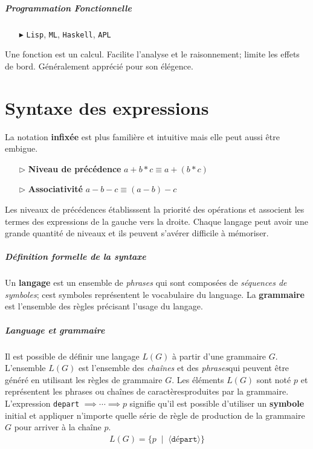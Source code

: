 \documentclass{report}
\begin{document}
\begin{multicols*}{3}
    \paragraph{Programmation Fonctionnelle}
    \begin{itemize}
        \item [$\blacktriangleright$ ] \texttt{Lisp}, \texttt{ML}, \texttt{Haskell}, \texttt{APL}
    \end{itemize}
    Une fonction est un calcul. Facilite l'analyse et le raisonnement; limite
    les effets de bord. Généralement apprécié pour son élégence. 


    \chapter{Syntaxe des expressions}
    La notation \textbf{infixée} est plus familière et intuitive mais elle peut aussi être embigue.   
    \begin{itemize}
        \item [$\rhd$ ] \textbf{Niveau de précédence} $a + b * c \equiv a + (b * c)$  
        \item [$\rhd$ ] \textbf{Associativité} $a - b - c \equiv (a - b) - c$
    \end{itemize}
    Les niveaux de précédences établisssent la priorité des opérations et
    associent les termes des expressions de la gauche vers la droite. Chaque
    langage peut avoir une grande quantité de niveaux et ils peuvent s'avérer
    difficile à mémoriser. 

    \paragraph{Définition formelle de la syntaxe}
    Un \textbf{langage} est un ensemble de \textit{phrases} qui sont composées
    de \textit{séquences de symboles}; cest symboles représentent le vocabulaire
    du language. La \textbf{grammaire} est l'ensemble des règles précisant
    l'usage du langage.  

    \paragraph{Language et grammaire}
    Il est possible de définir une langage $L(G)$ à partir d'une grammaire $G$.
    L'ensemble $L(G)$ est l'ensemble des \textit{chaînes} et des
    \textit{phrases}qui peuvent être généré en utilisant les règles de grammaire
    $G$. Les éléments $L(G)$ sont noté $p$ et représentent les phrases ou
    chaînes de caractèresproduites par la grammaire. L'expression
    \texttt{depart} $\implies \cdots \implies p$ signifie qu'il est possible
    d'utiliser un \textbf{symbole} initial et appliquer n'importe quelle série
    de règle de production de la grammaire $G$ pour arriver à la chaîne $p$. 
    \begin{align*}
    L(G) = \bigl\{ p \;\; | \;\; \langle \texttt{départ}  \rangle \bigr\}
    \end{align*}


\end{multicols*}
\end{document}
